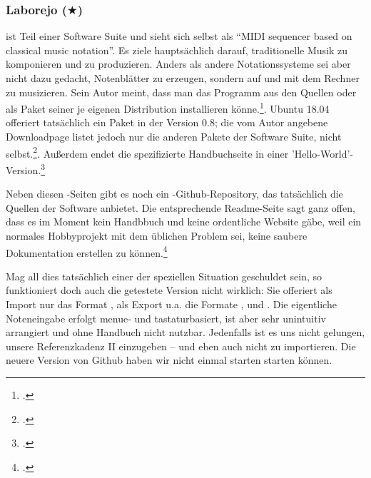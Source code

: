 %
%
%



\subsubsection{Laborejo ($\bigstar$)}

\label{Laborejo} ist Teil einer Software Suite und sieht sich
selbst als \enquote{MIDI sequencer based on classical music notation}. Es ziele
hauptsächlich darauf, traditionelle Musik zu komponieren und zu produzieren.
Anders als andere Notationssysteme sei  aber nicht dazu gedacht,
Notenblätter zu erzeugen, sondern auf und mit dem Rechner zu musizieren. Sein
Autor meint, dass man das Programm aus den Quellen oder als Paket seiner je
eigenen Distribution installieren könne.\footcite[vgl.][\nopage
wp]{Hilbricht2019a}. Ubuntu 18.04 offeriert tatsächlich ein Paket 
in der Version 0.8; die vom Autor angebene Downloadpage listet jedoch nur die
anderen Pakete der Software Suite, nicht 
selbst.\footcite[vgl.][\nopage wp]{Hilbricht2019b}. Außerdem endet die
spezifizierte Handbuchseite in einer
'Hello-World'-Version.\footcite[vgl.][\nopage wp]{Hilbricht2019c}

Neben diesen -Seiten gibt es noch ein
-Github-Repository, das tatsächlich die Quellen der Software
anbietet. Die entsprechende Readme-Seite sagt ganz offen, dass es im Moment kein
Handbbuch und keine ordentliche Website gäbe, weil  ein normales
Hobbyprojekt mit dem üblichen Problem sei, keine saubere Dokumentation erstellen
zu können.\footcite[vgl.][\nopage wp]{Laborejo2018a}

Mag all dies tatsächlich einer der speziellen Situation geschuldet sein, so
funktioniert doch auch die getestete Version nicht wirklich: Sie offeriert als
Import nur das Format , als Export u.a. die Formate ,
 und . Die eigentliche Noteneingabe erfolgt menue- und
tastaturbasiert, ist aber sehr unintuitiv arrangiert und ohne Handbuch nicht
nutzbar. Jedenfalls ist es uns nicht gelungen, unsere Referenzkadenz II
einzugeben -- und eben auch nicht zu importieren. Die neuere Version von Github
haben wir nicht einmal starten starten können.

